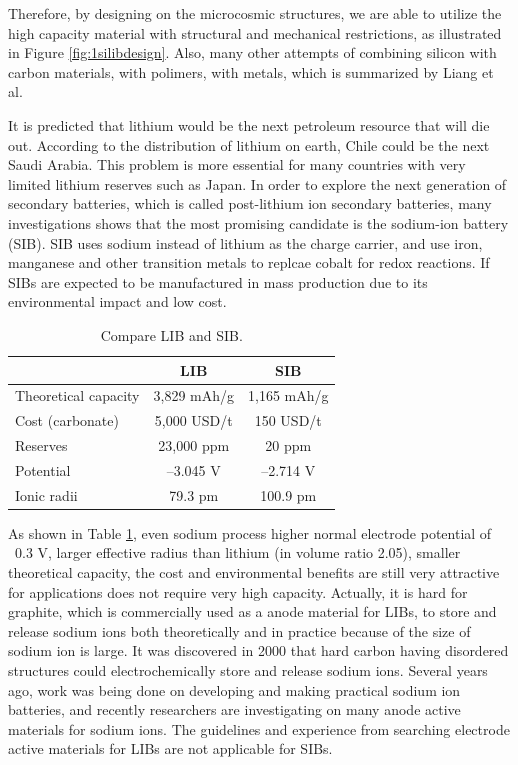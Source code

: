 Therefore, by designing on the microcosmic structures, we are able to utilize the high capacity material with structural and mechanical restrictions, as illustrated in Figure \ref{fig:1silibdesign}. Also, many other attempts of combining silicon with carbon materials, with polimers, with metals, which is summarized by Liang et al.\cite{Liang2014} 
 
It is predicted that lithium would be the next petroleum resource that will die out.\cite{Jaskula2016} According to the distribution of lithium on earth\cite{Jaskula2011}, Chile could be the next Saudi Arabia. This problem is more essential for many countries with very limited lithium reserves such as Japan.  In order to explore the next generation of secondary batteries, which is called post-lithium ion secondary batteries, many investigations
shows that the most promising candidate is the sodium-ion battery (SIB). SIB uses sodium instead of lithium as the charge carrier, and use iron, manganese and other transition metals to replcae cobalt for redox reactions. If SIBs are expected to be manufactured in mass production due to its
environmental impact and low cost.

\begin{table}[ht]
\centering %
\begin{tabular}{|l|c|c|} %
\hline %
 & LIB & SIB\\ [0.5ex] %
\hline %
Theoretical capacity & 3,829 mAh/g & 1,165 mAh/g \\[1.5ex] %
Cost (carbonate) & 5,000 USD/t & 150 USD/t \\[1.5ex]%
Reserves & 23,000 ppm & 20 ppm \\[1.5ex]
Potential & –3.045 V & –2.714 V \\[1.5ex]
Ionic radii & 79.3 pm & 100.9 pm \\[1.5ex]
\hline %
\end{tabular}
\caption{Compare LIB and SIB.} %
\label{table1.1} %
\end{table}

As shown in Table \ref{table1.1}, even sodium process higher normal electrode potential of ~0.3 V, larger effective radius than lithium (in volume ratio 2.05), smaller theoretical capacity, the cost and environmental benefits are still very attractive for applications does not require very high capacity. Actually, it is hard for graphite, which is commercially used as a anode material for LIBs, to store and release sodium ions both theoretically and in practice because of the size of sodium ion is large. It was discovered in 2000 that hard carbon having disordered structures could electrochemically store and release sodium ions.\cite{Stevens2000} Several
years ago, work was being done on developing and making practical sodium ion batteries, and recently researchers are investigating on many anode active materials for sodium ions. The guidelines and experience from searching electrode active materials for LIBs are not applicable
for SIBs.\cite{Lang2010,Armand2008,KUZE2013}

